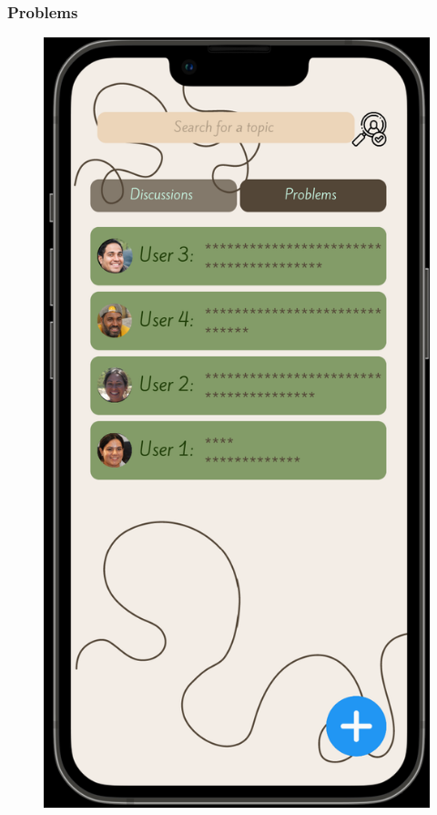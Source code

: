\subsubsection{Problems}
    \begin{figure}[ht]
        \centering
        \includegraphics[width = 0.5\linewidth]{figures/problems.png}
        \label{fig:profile}
    \end{figure}
\clearpage
